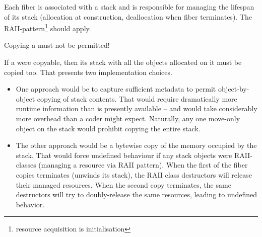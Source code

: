 \label{stackmgmt}

Each fiber is associated with a stack and is responsible for managing the lifespan
of its stack (allocation at construction, deallocation when fiber terminates). The
RAII-pattern\footnote{resource acquisition is initialisation} should apply.

Copying a \fiber must not be permitted!

If a \fiber were copyable, then its stack with all the objects allocated on it
must be copied too. That presents two implementation choices.
\begin{itemize}
    \item One approach would be to capture sufficient metadata to permit
          object-by-object copying of stack contents. That would require
          dramatically more runtime information than is presently available --
          and would take considerably more overhead than a coder might expect.
          Naturally, any one move-only object on the stack would prohibit
          copying the entire stack.
    \item The other approach would be a bytewise copy of the memory occupied
          by the stack. That would force undefined behaviour if any stack
          objects were RAII-classes (managing a resource via RAII pattern). When the first
          of the fiber copies terminates (unwinds its stack), the RAII class destructors
          will release their managed resources. When the second copy terminates, the same
          destructors will try to doubly-release the same resources, leading to undefined
          behavior.
\end{itemize}

